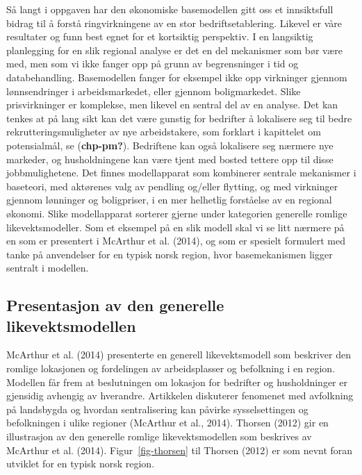 \documentclass[
]{article}
\begin{document}
Så langt i oppgaven har den økonomiske basemodellen gitt oss et
innsiktsfull bidrag til å forstå ringvirkningene av en stor
bedriftsetablering. Likevel er våre resultater og funn best egnet for et
kortsiktig perspektiv. I en langsiktig planlegging for en slik regional
analyse er det en del mekanismer som bør være med, men som vi ikke
fanger opp på grunn av begrensninger i tid og databehandling.
Basemodellen fanger for eksempel ikke opp virkninger gjennom
lønnsendringer i arbeidsmarkedet, eller gjennom boligmarkedet. Slike
prisvirkninger er komplekse, men likevel en sentral del av en analyse.
Det kan tenkes at på lang sikt kan det være gunstig for bedrifter å
lokalisere seg til bedre rekrutteringsmuligheter av nye arbeidstakere,
som forklart i kapittelet om potensialmål, se (\textbf{chp-pm?}).
Bedriftene kan også lokalisere seg nærmere nye markeder, og
husholdningene kan være tjent med bosted tettere opp til disse
jobbmulighetene. Det finnes modellapparat som kombinerer sentrale
mekanismer i baseteori, med aktørenes valg av pendling og/eller
flytting, og med virkninger gjennom lønninger og boligpriser, i en mer
helhetlig forståelse av en regional økonomi. Slike modellapparat
sorterer gjerne under kategorien generelle romlige likevektsmodeller.
Som et eksempel på en slik modell skal vi se litt nærmere på en som er
presentert i McArthur et al. (2014), og som er spesielt formulert med
tanke på anvendelser for en typisk norsk region, hvor basemekanismen
ligger sentralt i modellen.

\hypertarget{presentasjon-av-den-generelle-likevektsmodellen}{%
\subsection{Presentasjon av den generelle
likevektsmodellen}\label{presentasjon-av-den-generelle-likevektsmodellen}}

McArthur et al. (2014) presenterte en generell likevektsmodell som
beskriver den romlige lokasjonen og fordelingen av arbeidsplasser og
befolkning i en region. Modellen får frem at beslutningen om lokasjon
for bedrifter og husholdninger er gjensidig avhengig av hverandre.
Artikkelen diskuterer fenomenet med avfolkning på landsbygda og hvordan
sentralisering kan påvirke sysselsettingen og befolkningen i ulike
regioner (McArthur et al., 2014). Thorsen (2012) gir en illustrasjon av
den generelle romlige likevektsmodellen som beskrives av McArthur et al.
(2014). Figur~\ref{fig-thorsen} til Thorsen (2012) er som nevnt foran
utviklet for en typisk norsk region.
\end{document}
